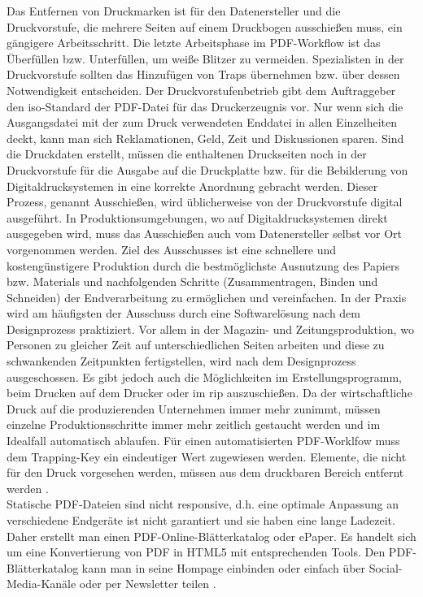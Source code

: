 Das Entfernen von Druckmarken ist für den Datenersteller und die Druckvorstufe, die mehrere Seiten auf einem Druckbogen ausschießen muss, ein gängigere Arbeitsschritt. Die letzte Arbeitsphase im PDF-Workflow ist das Überfüllen bzw. Unterfüllen, um weiße Blitzer zu vermeiden. Spezialisten in der Druckvorstufe sollten das Hinzufügen von Traps übernehmen bzw. über dessen Notwendigkeit entscheiden. Der Druckvorstufenbetrieb gibt dem Auftraggeber den \gls{iso}-Standard der PDF-Datei für das Druckerzeugnis vor. Nur wenn sich die Ausgangsdatei mit der zum Druck verwendeten Enddatei in allen Einzelheiten deckt, kann man sich Reklamationen, Geld, Zeit und Diskussionen sparen. Sind die Druckdaten erstellt, müssen die enthaltenen Druckseiten noch in der Druckvorstufe für die Ausgabe auf die Druckplatte bzw. für die Bebilderung von Digitaldrucksystemen in eine korrekte Anordnung gebracht werden. Dieser Prozess, genannt Ausschießen, wird üblicherweise von der Druckvorstufe digital ausgeführt. In Produktionsumgebungen, wo auf Digitaldrucksystemen direkt ausgegeben wird, muss das Ausschießen auch vom Datenersteller selbst vor Ort vorgenommen werden. Ziel des Ausschusses ist eine schnellere und kostengünstigere Produktion durch die bestmöglichste Ausnutzung des Papiers bzw. Materials und nachfolgenden Schritte (Zusammentragen, Binden und Schneiden) der Endverarbeitung zu ermöglichen und vereinfachen. In der Praxis wird am häufigsten der Ausschuss durch eine Softwarelösung nach dem Designprozess praktiziert. Vor allem in der Magazin- und Zeitungsproduktion, wo Personen zu gleicher Zeit auf unterschiedlichen Seiten arbeiten und diese zu schwankenden Zeitpunkten fertigstellen, wird nach dem Designprozess ausgeschossen. Es gibt jedoch auch die Möglichkeiten im Erstellungsprogramm, beim Drucken auf dem Drucker oder im \gls{rip} auszuschießen. Da der wirtschaftliche Druck auf die produzierenden Unternehmen immer mehr zunimmt, müssen einzelne Produktionsschritte immer mehr zeitlich gestaucht werden und im Idealfall automatisch ablaufen. Für einen automatisierten PDF-Worklfow muss dem Trapping-Key ein eindeutiger Wert zugewiesen werden. Elemente, die nicht für den Druck vorgesehen werden, müssen aus dem druckbaren Bereich entfernt werden \cite{schneeberger}. \\
Statische PDF-Dateien sind nicht responsive, d.h. eine optimale Anpassung an verschiedene Endgeräte ist nicht garantiert und sie haben eine lange Ladezeit. Daher erstellt man einen PDF-Online-Blätterkatalog oder ePaper. Es handelt sich um eine Konvertierung von PDF in HTML5 mit entsprechenden Tools. Den PDF-Blätterkatalog kann man in seine Hompage einbinden oder einfach über Social-Media-Kanäle oder per Newsletter teilen \cite{mypdf-blaetterk}.